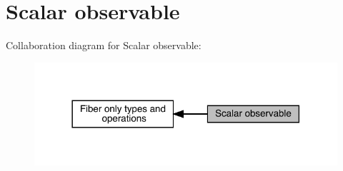 \hypertarget{group__obsscalar}{}\section{Scalar observable}
\label{group__obsscalar}
Collaboration diagram for Scalar observable\+:\nopagebreak
\begin{figure}[H]
\begin{center}
\leavevmode
\includegraphics[width=318pt]{d1/d71/group__obsscalar}
\end{center}
\end{figure}
